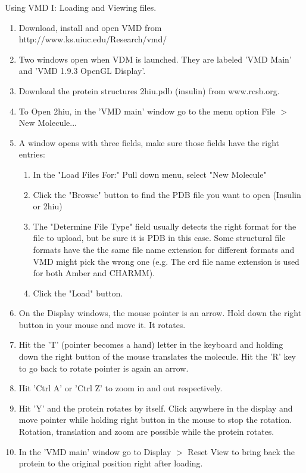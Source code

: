 \documentclass{beamer}
\begin{document}
\begin{frame}[shrink=30]{Using VMD I: Loading and Viewing files.}
   \begin{enumerate}
      \item Download, install and open VMD from http://www.ks.uiuc.edu/Research/vmd/
      \item Two windows open when VDM is launched. They are labeled 'VMD Main' and 'VMD 1.9.3 OpenGL Display'.
      \item Download the protein structures 2hiu.pdb (insulin) from www.rcsb.org.
      \item To Open 2hiu, in the 'VMD main' window go to the menu option File $>$ New Molecule...
      \item A window opens with three fields, make sure those fields have the right entries:
            \begin{enumerate}
               \item In the "Load Files For:" Pull down menu, select "New Molecule"
               \item Click the "Browse" button to find the PDB file you want to open (Insulin or 2hiu)
               \item The "Determine File Type" field usually detects the right format for the file to upload, but be sure
                     it is PDB in this case. Some structural file formats have the the same file name extension for different formats
                     and VMD might pick the wrong one (e.g. The crd file name extension is used for both Amber and CHARMM).
               \item Click the "Load" button.
            \end{enumerate}
      \item On the Display windows, the mouse pointer is an arrow. Hold down the right button in your mouse and move it. It rotates.
      \item Hit the 'T' (pointer becomes a hand) letter in the keyboard and holding down the right button of the mouse translates the molecule. 
            Hit the 'R' key to go back to rotate pointer is again an arrow.
      \item Hit 'Ctrl A' or 'Ctrl Z' to zoom in and out respectively.
      \item Hit 'Y' and the protein rotates by itself. Click anywhere in the display and move pointer while holding right button in the mouse to stop the rotation.
            Rotation, translation and zoom are possible while the protein rotates.
      \item In the 'VMD main' window go to Display $>$ Reset View to bring back the protein to the original position right after loading.
   \end{enumerate}
\end{frame}
\end{document}
